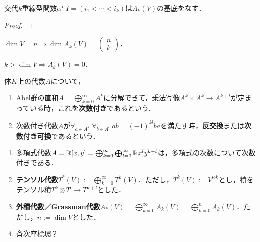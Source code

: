 \documentclass[uplatex,dvipdfmx]{jsreport}
\begin{document}
\begin{proposition}[$k$-covector空間の基底]
    交代$k$重線型関数$\alpha^I\;I=(i_1<\cdots<i_k)$は$A_k(V)$の基底をなす．
\end{proposition}
\begin{proof}
    
\end{proof}

\begin{corollary}
    $\dim V=n\Rightarrow \dim A_k(V)=\begin{pmatrix}n\\k\end{pmatrix}$．
\end{corollary}

\begin{corollary}
    $k>\dim V\Rightarrow A_k(V)=0$．
\end{corollary}

\begin{definition}[graded]
    体$K$上の代数$A$について，
    \begin{enumerate}
        \item Abel群の直和$A=\bigoplus^\infty_{k=0}A^k$に分解できて，乗法写像$A^k\times A^k\to A^{k+l}$が定まっている時，これを\textbf{次数付き}であるという．
        \item 次数付き代数$A$が$\forall_{a\in A^k}\;\forall_{b\in A^l}\;ab=(-1)^{kl}ba$を満たす時，\textbf{反交換}または\textbf{次数付き可換}であるという．
    \end{enumerate}
\end{definition}

\begin{example}\mbox{}
    \begin{enumerate}
        \item 多項式代数$A=\mathbb{R}[x,y]=\bigoplus_{k=0}^\infty\bigoplus_{l=0}^\infty\mathbb{R} x^ly^{k-l}$は，多項式の次数について次数付きである．
        \item \textbf{テンソル代数}$T^*(V):=\bigoplus^\infty_{k=0}T^k(V)$．ただし，$T^k(V):=V^{\otimes k}$とし，積をテンソル積$T^k\otimes T^l\to T^{k+l}$とした．
        \item \textbf{外積代数／Grassman代数}$A_*(V)=\bigoplus^\infty_{k=0}A_k(V)=\bigoplus^n_{k=0}A_k(V)$．ただし，$n:=\dim V$とした．
        \item 斉次座標環？
    \end{enumerate}
\end{example}
\end{document}
